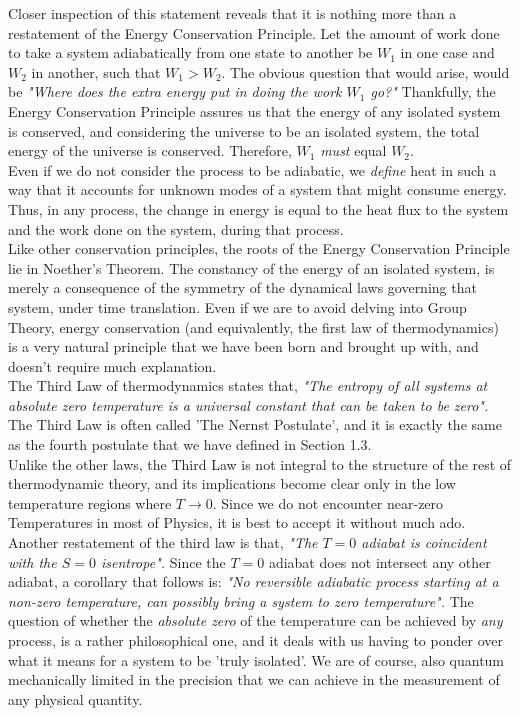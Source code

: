 \documentclass[oneside]{book}
\begin{document}
Closer inspection of this statement reveals that it is nothing more than a restatement of the Energy Conservation Principle. Let the amount of work done to take a system adiabatically from one state to another  be $W_1$ in one case and $W_2$ in another, such that $W_1>W_2$. The obvious question that would arise, would be \emph{"Where does the extra energy put in doing the work $W_1$ go?"} Thankfully, the Energy Conservation Principle assures us that the energy of any isolated system is conserved, and considering the universe to be an isolated system, the total energy of the universe is conserved. Therefore, $W_1$ \emph{must} equal $W_2$.\\

 Even if we do not consider the process to be adiabatic, we \emph{define} heat in such a way that it accounts for unknown modes of a system that might consume energy. Thus, in any process, the change in energy is equal to the heat flux to the system and the work done on the system, during that process.\\

Like other conservation principles, the roots of the Energy Conservation Principle lie in Noether's Theorem. The constancy of the energy of an isolated system, is merely a consequence of the symmetry of the dynamical laws governing that system, under time translation. Even if we are to avoid delving into Group Theory, energy conservation (and equivalently, the first law of thermodynamics) is a very natural principle that we have been born and brought up with, and doesn't require much explanation.\\

The Third Law of thermodynamics states that, \emph{"The entropy of all systems at absolute zero  temperature is a universal constant that can be taken to be zero".} The Third Law is often called 'The Nernst Postulate', and it is exactly the same as the fourth postulate that we have defined in Section 1.3.\\

Unlike the other laws, the Third Law is not integral to the structure of the rest of thermodynamic theory, and its implications become clear only in the low temperature regions where $T \rightarrow 0$. Since we do not encounter near-zero Temperatures in most of Physics, it is best to accept it without much ado.\\

 Another restatement of the third law is that, \emph{"The $T=0$ adiabat is coincident with the 
$S = 0$ isentrope".} Since the $T=0$ adiabat does not intersect any other adiabat, a corollary that follows is: \emph{"No reversible adiabatic process starting at a non-zero temperature, can possibly bring a system to zero temperature".} The question of whether the \emph{absolute zero} of the temperature can be achieved by \emph{any} process, is a rather philosophical one, and it deals with us having to ponder over what it means for a system to be 'truly isolated'. We are of course, also quantum mechanically limited in the precision that we can achieve in the measurement of any physical quantity. 
\end{document}
